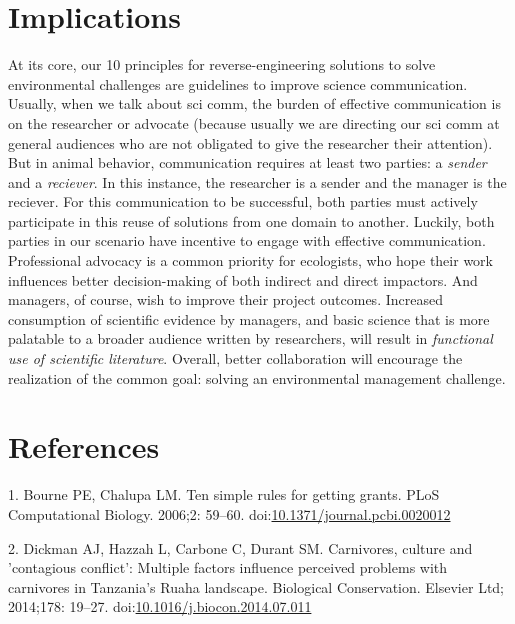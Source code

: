 \documentclass[10pt,letterpaper]{article}
\begin{document}
\section{Implications}\label{implications}

At its core, our 10 principles for reverse-engineering solutions to
solve environmental challenges are guidelines to improve science
communication. Usually, when we talk about sci comm, the burden of
effective communication is on the researcher or advocate (because
usually we are directing our sci comm at general audiences who are not
obligated to give the researcher their attention). But in animal
behavior, communication requires at least two parties: a \emph{sender}
and a \emph{reciever}. In this instance, the researcher is a sender and
the manager is the reciever. For this communication to be successful,
both parties must actively participate in this reuse of solutions from
one domain to another. Luckily, both parties in our scenario have
incentive to engage with effective communication. Professional advocacy
is a common priority for ecologists, who hope their work influences
better decision-making of both indirect and direct impactors. And
managers, of course, wish to improve their project outcomes. Increased
consumption of scientific evidence by managers, and basic science that
is more palatable to a broader audience written by researchers, will
result in \emph{functional use of scientific literature}. Overall,
better collaboration will encourage the realization of the common goal:
solving an environmental management challenge.

\section*{References}\label{references}

\hypertarget{refs}{}
\hypertarget{ref-Bourne2006}{}
1. Bourne PE, Chalupa LM. Ten simple rules for getting grants. PLoS
Computational Biology. 2006;2: 59--60.
doi:\href{https://doi.org/10.1371/journal.pcbi.0020012}{10.1371/journal.pcbi.0020012}

\hypertarget{ref-Dickman2014}{}
2. Dickman AJ, Hazzah L, Carbone C, Durant SM. Carnivores, culture and
'contagious conflict': Multiple factors influence perceived problems
with carnivores in Tanzania's Ruaha landscape. Biological Conservation.
Elsevier Ltd; 2014;178: 19--27.
doi:\href{https://doi.org/10.1016/j.biocon.2014.07.011}{10.1016/j.biocon.2014.07.011}
\end{document}
